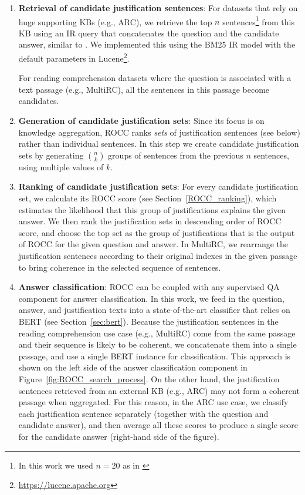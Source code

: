 \begin{enumerate}[label={\bf(\arabic*)}, topsep=0.2em, itemsep=0.1em, wide, labelwidth=!, labelindent=0pt]
\item \textbf{Retrieval of candidate justification sentences}: For datasets that rely on huge supporting KBs (e.g., ARC), we retrieve the top $n$ sentences\footnote{In this work we used $n = 20$ as in \citet{yadav_AHE}} from this KB using an IR query that concatenates the question and the candidate answer, similar to \citet{clark2018think, yadav_AHE}. We implemented this using the BM25 IR model with the default parameters in  Lucene\footnote{\url{https://lucene.apache.org}}.

For reading comprehension datasets where the question is associated with a text passage (e.g., MultiRC), all the sentences in this passage become candidates. 

\item \textbf{Generation of candidate justification sets}: Since its focus is on knowledge aggregation, ROCC ranks {\em sets} of justification sentences (see below) rather than individual sentences. In this step we create candidate justification sets by generating $n \choose k$ groups of sentences from the previous $n$ sentences, using multiple values of $k$. 

\item \textbf{Ranking of candidate justification sets}:  For every candidate justification set, we calculate its ROCC score (see Section~\ref{ROCC_ranking}), which estimates the likelihood that this group of justifications explains the given answer. We then rank the justification sets in descending order of ROCC score, and choose the top set as the group of justifications that is the output of ROCC for the given question and answer. In MultiRC, we rearrange the justification sentences according to their original indexes in the given passage to bring coherence in the selected sequence of sentences.

\item \textbf{Answer classification}: ROCC can be coupled with any supervised QA component for answer classification. In this work, we feed in the question, answer, and justification texts into a state-of-the-art classifier that relies on BERT (see Section~\ref{sec:bert}). 
Because the justification sentences in the reading comprehension use case (e.g., MultiRC) come from the same passage and their sequence is likely to be coherent, we concatenate them into a single passage, and use a single BERT instance for classification. This approach is shown on the left side of the answer classification component in Figure~\ref{fig:ROCC_search_process}.
On the other hand, the justification sentences retrieved from an external KB (e.g., ARC) may not form a coherent passage when aggregated. For this reason, in the ARC use case, we classify each justification sentence separately (together with the question and candidate answer), and then average all these scores to produce a single score for the candidate answer (right-hand side of the figure).
\end{enumerate}

